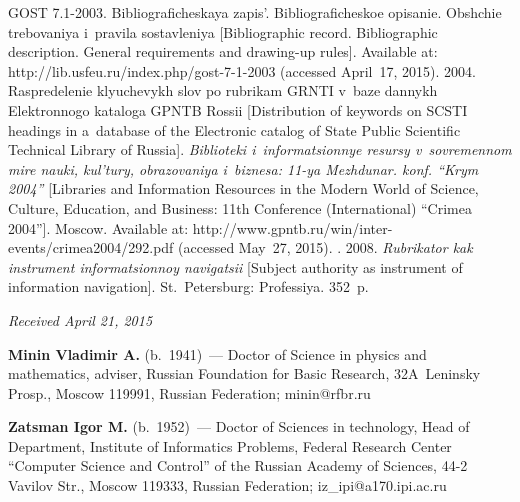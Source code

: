 \begin{multicols}{2}
{{\begin{thebibliography}{99}
GOST 7.1-2003. Bibliograficheskaya zapis'. Bibliografi\-che\-skoe opisanie. Obshchie
trebovaniya i~pravila sostav\-le\-niya [Bibliographic record. Bibliographic description. General
requirements and drawing-up rules]. Available at:
{\sf http://lib.usfeu.ru/index.php/gost-7-1-2003} (accessed April~17, 2015).
 2004. Raspredelenie klyuchevykh slov po rubrikam GRNTI
v~baze dannykh Elektronnogo kataloga GPNTB Rossii
[Distribution of keywords on SCSTI
headings in a~database of the Electronic catalog of State Public
Scientific Technical Library of Russia].
\textit{Biblioteki i~informatsionnye resursy v~sovremennom mire nauki, kul'tury,
obrazovaniya i~biznesa: 11-ya Mezhdunar. konf. ``Krym 2004''} [Libraries and
Information
Resources in the Modern World of Science, Culture, Education, and Business: 11th
Conference (International) ``Crimea 2004'']. Moscow.
Available at: {\sf http://www.gpntb.ru/win/inter-events/crimea2004/292.pdf}
(accessed May~27, 2015).
. 2008.
\textit{Rubrikator kak instrument informatsionnoy navigatsii} [Subject authority as
instrument of information navigation]. St.\ Petersburg: Professiya. 352~p.
\end{thebibliography}

 }
 }

\end{multicols}

\vspace*{-3pt}

\hfill{\small\textit{Received April 21, 2015}}


\Contr

\noindent
\textbf{Minin Vladimir A.} (b.\ 1941)~--- Doctor of Science in physics and
mathematics, adviser, Russian Foundation for Basic Research, 32A~Leninsky
Prosp., Moscow 119991, Russian Federation; minin@rfbr.ru

\pagebreak

\noindent
\textbf{Zatsman Igor M.} (b.\ 1952)~---
Doctor of Sciences in technology, Head of Department, Institute of Informatics
Problems, Federal Research Center ``Computer Science and Control'' of the
Russian Academy of Sciences, 44-2 Vavilov Str., Moscow 119333, Russian
Federation; iz\_ipi@a170.ipi.ac.ru

\vspace*{4pt}


